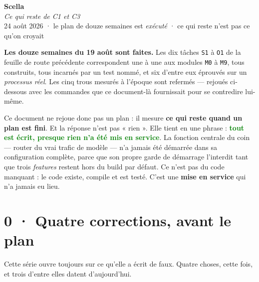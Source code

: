 \documentclass[10pt]{article}
\newcommand{\best}[1]{\textcolor{green}{\textbf{#1}}}
\newcommand{\code}[1]{\texttt{\small #1}}
\begin{document}
\begin{center}
{\Huge\bfseries\color{navy} Scella}\\[4pt]
{\large\color{grey}\itshape Ce qui reste de C1 et C3}\\[4pt]
{\small\color{grey} 24 août 2026 \; · \; le plan de douze semaines est \emph{exécuté} \; · \; ce qui
reste n'est pas ce qu'on croyait}
\end{center}
\vspace{2pt}

\begin{these}
\textbf{Les douze semaines du 19 août sont faites.} Les dix tâches \code{S1} à \code{O1} de la
feuille de route précédente correspondent une à une aux modules \code{M0} à \code{M9}, tous
construits, tous incarnés par un test nommé, et six d'entre eux éprouvés sur un \emph{processus
réel}. Les cinq trous mesurés à l'époque sont refermés --- rejoués ci-dessous avec les commandes
que ce document-là fournissait pour se contredire lui-même.

Ce document ne rejoue donc pas un plan : il mesure \textbf{ce qui reste quand un plan est fini}. Et
la réponse n'est pas « rien ». Elle tient en une phrase : \best{tout est écrit, presque rien n'a été
mis en service}. La fonction centrale du coin --- router du vrai trafic de modèle --- n'a jamais été
démarrée dans sa configuration complète, parce que son propre garde de démarrage l'interdit tant que
trois \emph{features} restent hors du build par défaut. Ce n'est pas du code manquant : le code
existe, compile et est testé. C'est une \textbf{mise en service} qui n'a jamais eu lieu.
\end{these}

\section{0 · Quatre corrections, avant le plan}

Cette série ouvre toujours sur ce qu'elle a écrit de faux. Quatre choses, cette fois, et trois
d'entre elles datent d'aujourd'hui.
\end{document}
